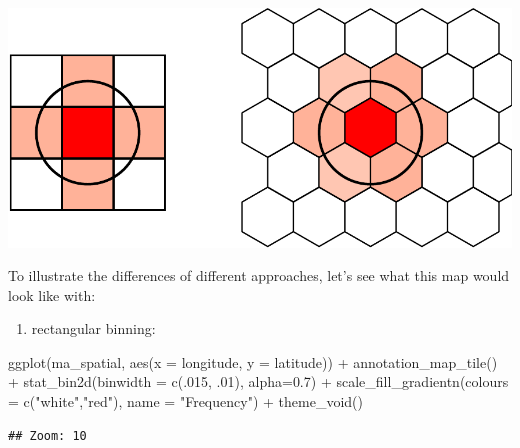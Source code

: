 \documentclass[
]{book}
\makeatletter
\newenvironment{Shaded}{\begin{snugshade}}{\end{snugshade}}
\newcommand{\AttributeTok}[1]{\textcolor[rgb]{0.61,0.61,0.61}{#1}}
\newcommand{\DecValTok}[1]{\textcolor[rgb]{0.06,0.06,0.06}{#1}}
\newcommand{\FloatTok}[1]{\textcolor[rgb]{0.06,0.06,0.06}{#1}}
\newcommand{\FunctionTok}[1]{\textcolor[rgb]{0,0,0}{#1}}
\newcommand{\NormalTok}[1]{#1}
\newcommand{\SpecialCharTok}[1]{\textcolor[rgb]{0,0,0}{#1}}
\newcommand{\StringTok}[1]{\textcolor[rgb]{0.5,0.5,0.5}{#1}}
\providecommand{\tightlist}{%
  \setlength{\itemsep}{0pt}\setlength{\parskip}{0pt}}
\newenvironment{kframe}{%
\medskip{}
\setlength{\fboxsep}{.8em}
 \def\at@end@of@kframe{}%
 \ifinner\ifhmode%
  \def\at@end@of@kframe{\end{minipage}}%
  \begin{minipage}{\columnwidth}%
 \fi\fi%
 \def\FrameCommand##1{\hskip\@totalleftmargin \hskip-\fboxsep
 \colorbox{shadecolor}{##1}\hskip-\fboxsep
     \hskip-\linewidth \hskip-\@totalleftmargin \hskip\columnwidth}%
 \MakeFramed {\advance\hsize-\width
   \@totalleftmargin\z@ \linewidth\hsize
   \@setminipage}}%
 {\par\unskip\endMakeFramed%
 \at@end@of@kframe}
\renewenvironment{Shaded}{\begin{kframe}}{\end{kframe}}
\makeatother
\begin{document}
\includegraphics{crime_mapping_files/figure-latex/unnamed-chunk-127-1.pdf}

To illustrate the differences of different approaches, let's see what this map would look like with:

\begin{enumerate}
\def\labelenumi{\alph{enumi})}
\tightlist
\item
  rectangular binning:
\end{enumerate}

\begin{Shaded}
\begin{Highlighting}[]
\FunctionTok{ggplot}\NormalTok{(ma\_spatial, }\FunctionTok{aes}\NormalTok{(}\AttributeTok{x =}\NormalTok{ longitude, }\AttributeTok{y =}\NormalTok{ latitude)) }\SpecialCharTok{+} 
  \FunctionTok{annotation\_map\_tile}\NormalTok{() }\SpecialCharTok{+} 
  \FunctionTok{stat\_bin2d}\NormalTok{(}\AttributeTok{binwidth =} \FunctionTok{c}\NormalTok{(.}\DecValTok{015}\NormalTok{, .}\DecValTok{01}\NormalTok{), }\AttributeTok{alpha=}\FloatTok{0.7}\NormalTok{) }\SpecialCharTok{+} 
  \FunctionTok{scale\_fill\_gradientn}\NormalTok{(}\AttributeTok{colours =} \FunctionTok{c}\NormalTok{(}\StringTok{"white"}\NormalTok{,}\StringTok{"red"}\NormalTok{), }
                       \AttributeTok{name =} \StringTok{"Frequency"}\NormalTok{) }\SpecialCharTok{+} 
  \FunctionTok{theme\_void}\NormalTok{()}
\end{Highlighting}
\end{Shaded}

\begin{verbatim}
## Zoom: 10
\end{verbatim}
\end{document}
